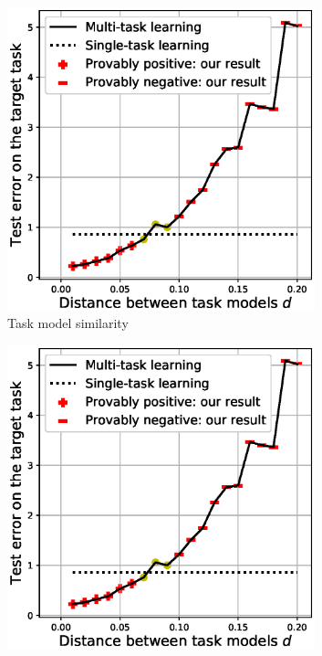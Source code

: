 \begin{figure}
	\begin{subfigure}[b]{0.31\textwidth}
		\centering
		\includegraphics[width=0.98\textwidth]{figures/model_shift_phase_transition.eps}
		\caption{Task model similarity}
	\end{subfigure}\hfill
	\begin{subfigure}[b]{0.31\textwidth}
		\centering
		\includegraphics[width=0.98\textwidth]{figures/model_shift_phase_transition.eps}

\end{subfigure}
\end{figure}
